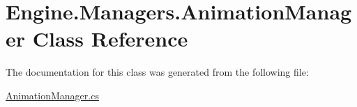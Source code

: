 \hypertarget{a00298}{}\section{Engine.\+Managers.\+Animation\+Manager Class Reference}
\label{a00298}


The documentation for this class was generated from the following file\+:\begin{DoxyCompactItemize}
\item 
\hyperlink{a00002}{Animation\+Manager.\+cs}\end{DoxyCompactItemize}
